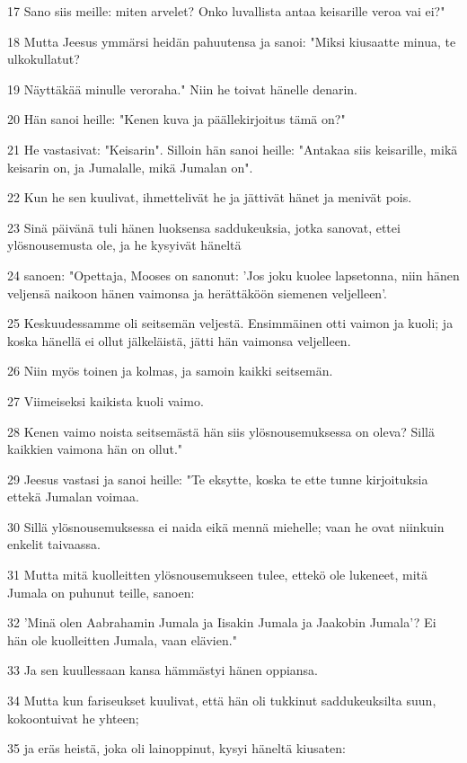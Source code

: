\par 17 Sano siis meille: miten arvelet? Onko luvallista antaa keisarille veroa vai ei?"
\par 18 Mutta Jeesus ymmärsi heidän pahuutensa ja sanoi: "Miksi kiusaatte minua, te ulkokullatut?
\par 19 Näyttäkää minulle veroraha." Niin he toivat hänelle denarin.
\par 20 Hän sanoi heille: "Kenen kuva ja päällekirjoitus tämä on?"
\par 21 He vastasivat: "Keisarin". Silloin hän sanoi heille: "Antakaa siis keisarille, mikä keisarin on, ja Jumalalle, mikä Jumalan on".
\par 22 Kun he sen kuulivat, ihmettelivät he ja jättivät hänet ja menivät pois.
\par 23 Sinä päivänä tuli hänen luoksensa saddukeuksia, jotka sanovat, ettei ylösnousemusta ole, ja he kysyivät häneltä
\par 24 sanoen: "Opettaja, Mooses on sanonut: 'Jos joku kuolee lapsetonna, niin hänen veljensä naikoon hänen vaimonsa ja herättäköön siemenen veljelleen'.
\par 25 Keskuudessamme oli seitsemän veljestä. Ensimmäinen otti vaimon ja kuoli; ja koska hänellä ei ollut jälkeläistä, jätti hän vaimonsa veljelleen.
\par 26 Niin myös toinen ja kolmas, ja samoin kaikki seitsemän.
\par 27 Viimeiseksi kaikista kuoli vaimo.
\par 28 Kenen vaimo noista seitsemästä hän siis ylösnousemuksessa on oleva? Sillä kaikkien vaimona hän on ollut."
\par 29 Jeesus vastasi ja sanoi heille: "Te eksytte, koska te ette tunne kirjoituksia ettekä Jumalan voimaa.
\par 30 Sillä ylösnousemuksessa ei naida eikä mennä miehelle; vaan he ovat niinkuin enkelit taivaassa.
\par 31 Mutta mitä kuolleitten ylösnousemukseen tulee, ettekö ole lukeneet, mitä Jumala on puhunut teille, sanoen:
\par 32 'Minä olen Aabrahamin Jumala ja Iisakin Jumala ja Jaakobin Jumala'? Ei hän ole kuolleitten Jumala, vaan elävien."
\par 33 Ja sen kuullessaan kansa hämmästyi hänen oppiansa.
\par 34 Mutta kun fariseukset kuulivat, että hän oli tukkinut saddukeuksilta suun, kokoontuivat he yhteen;
\par 35 ja eräs heistä, joka oli lainoppinut, kysyi häneltä kiusaten:

